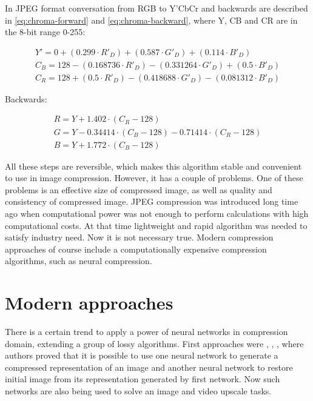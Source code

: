 In JPEG format conversation from RGB to Y'CbCr and backwards are described in \ref{eq:chroma-forward} and \ref{eq:chroma-backward}, where Y, CB and CR are in the 8-bit range 0-255:

\begin{equation}
    \label{eq:chroma-forward}
    \begin{split}
        Y'=0+(0.299\cdot R'_{D})+(0.587\cdot G'_{D})+(0.114\cdot B'_{D}) \\
        C_{B}=128-(0.168736\cdot R'_{D})-(0.331264\cdot G'_{D})+(0.5\cdot B'_{D}) \\
        C_{R}=128+(0.5\cdot R'_{D})-(0.418688\cdot G'_{D})-(0.081312\cdot B'_{D})
    \end{split}
\end{equation}

Backwards:

\begin{equation}
    \label{eq:chroma-backward}
    \begin{split}
        R=Y+1.402\cdot (C_{R}-128) \\
        G=Y-0.34414\cdot (C_{B}-128)-0.71414\cdot (C_{R}-128) \\
        B=Y+1.772\cdot (C_{B}-128)
    \end{split}
\end{equation}

All these steps are reversible, which makes this algorithm stable and convenient to use in image compression. However, it has a couple of problems. One of these problems is an effective size of compressed image, as well as quality and consistency of compressed image. JPEG compression was introduced long time ago when computational power was not enough to perform calculations with high computational costs. At that time lightweight and rapid algorithm was needed to satisfy industry need. Now it is not necessary true. Modern compression approaches of course include a computationally expensive compression algorithms, such as neural compression.

\section{Modern approaches}

There is a certain trend to apply a power of neural networks in compression domain, extending a group of lossy algorithms. First approaches were \cite{Balle_Laparra_Simoncelli_2017}, \cite{Theis_Shi_Cunningham_Huszar_2017}, \cite{Toderici_Vincent_Johnston_Hwang_Minnen_Shor_Covell_2017}, where authors proved that it is possible to use one neural network to generate a compressed representation of an image and another neural network to restore initial image from its representation generated by first network. Now such networks are also being used to solve an image and video upscale tasks.

